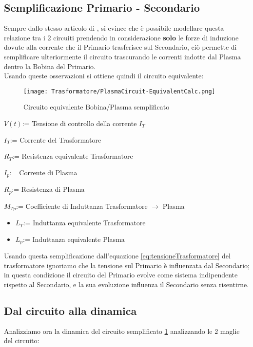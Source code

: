 \subsection{Semplificazione Primario - Secondario}
Sempre dallo stesso articolo di \cite{TokamakCircuit}, si evince che è possibile modellare questa relazione tra i 2 circuiti prendendo in considerazione \textbf{solo} le forze di induzione dovute alla corrente che il Primario trasferisce sul Secondario, ciò permette di semplificare ulteriormente il circuito trascurando le correnti indotte dal Plasma dentro la Bobina del Primario.\\
Usando queste osservazioni si ottiene quindi il circuito equivalente:
\begin{figure}[H]	\label{fig:PlasmaSemplificato}
	\centering
	\caption[Circuito Equivalente Bobina/Plasma all'interno di un Tokamak trascurando l'induzione del Plasma verso la bobina]{Circuito equivalente Bobina/Plasma semplificato}
	\texttt{[image: Trasformatore/PlasmaCircuit-EquivalentCalc.png]}
\end{figure}

\begin{leg}
	\item $V(t)$\tab:= Tensione di controllo della corrente $I_T$
	\item $I_T$\tab:= Corrente del Trasformatore
	\item $R_T$\tab:= Resistenza equivalente Trasformatore
	\item $I_p$\tab:= Corrente di Plasma
	\item $R_p$\tab:= Resistenza di Plasma
	\item $M_{Tp}$\tab:= Coefficiente di Induttanza Trasformatore $\rightarrow$ Plasma
	\begin{itemize} [topsep=-1mm,itemsep=0mm,label=$ \circ $]
		\item $L_T$\tab:= Induttanza equivalente Trasformatore
		\item $L_p$\tab:= Induttanza equivalente Plasma
	\end{itemize}
\end{leg}
\noindent
Usando questa semplificazione dall'equazione \ref{eq:tensioneTrasformatore} del trasformatore ignoriamo che la tensione sul Primario è influenzata dal Secondario; in questa condizione il circuito del Primario evolve come sistema indipendente rispetto al Secondario, e la sua evoluzione influenza il Secondario senza risentirne.

\newpage
\subsection{Dal circuito alla dinamica}\label{subsec:dinamicaCircuito}
Analizziamo ora la dinamica del circuito semplificato \ref{fig:PlasmaSemplificato} analizzando le 2 maglie del circuito:
